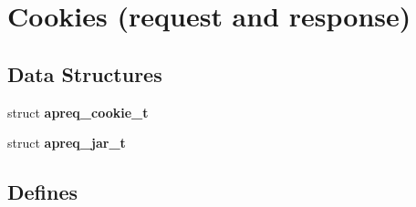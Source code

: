\section{Cookies (request and response)}
\label{group__cookies}
\subsection*{Data Structures}
\begin{CompactItemize}
\item 
struct {\bf apreq\_\-cookie\_\-t}
\item 
struct {\bf apreq\_\-jar\_\-t}
\end{CompactItemize}
\subsection*{Defines}
